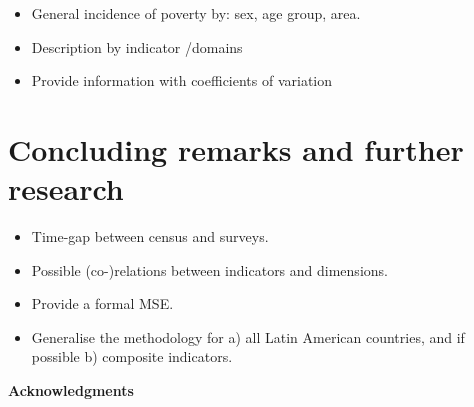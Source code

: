 \documentclass[a4paper, 11pt]{article}
\begin{document}
\begin{itemize}
    \item General incidence of poverty by: sex, age group, area.
    \item Description by indicator /domains
    \item Provide information with coefficients of variation 
\end{itemize}






\section{Concluding remarks and further research}


\begin{itemize}
    \item Time-gap between census and surveys.
    \item Possible (co-)relations between indicators and dimensions. 
    \item Provide a formal MSE. 
    \item Generalise the methodology for a) all Latin American countries, and if possible b) composite indicators. 
\end{itemize}

\textbf{Acknowledgments}


\newpage


\end{document}
